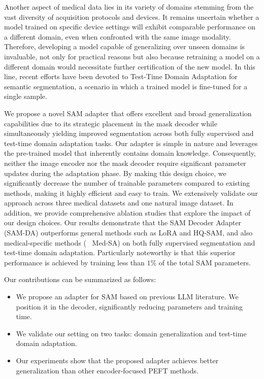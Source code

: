 Another aspect of medical data lies in its variety of domains stemming from the vast diversity of acquisition protocols and devices. It remains uncertain whether a model trained on specific device settings will exhibit comparable performance on a different domain, even when confronted with the same image modality. Therefore, developing a model capable of generalizing over unseen domains is invaluable, not only for practical reasons but also because retraining a model on a different domain would necessitate further certification of the new model. In this line, recent efforts have been devoted to Test-Time Domain Adaptation for semantic segmentation, a scenario in which a trained model is fine-tuned for a single sample. 

We propose a novel SAM adapter that offers excellent and broad generalization capabilities due to its strategic placement in the mask decoder while simultaneously yielding improved segmentation across both fully supervised and test-time domain adaptation tasks. Our adapter is simple in nature and leverages the pre-trained model that inherently contains domain knowledge. Consequently, neither the image encoder nor the mask decoder require significant parameter updates during the adaptation phase. By making this design choice, we significantly decrease the number of trainable parameters compared to existing methods, making it highly efficient and easy to train. We extensively validate our approach across three medical datasets and one natural image dataset. In addition, we provide comprehensive ablation studies that explore the impact of our design choices. Our results demonstrate that the SAM Decoder Adapter (SAM-DA) outperforms general methods such as LoRA and HQ-SAM, and also medical-specific methods (\eg~ Med-SA) on both fully supervised segmentation and test-time domain adaptation. Particularly noteworthy is that this superior performance is achieved by training less than $1\%$ of the total SAM parameters.

Our contributions can be summarized as follows:
\begin{itemize}
    \item We propose an adapter for SAM based on previous LLM literature. We position it in the decoder, significantly reducing parameters and training time.
    \item We validate our setting on two tasks: domain generalization and test-time domain adaptation. 
    \item Our experiments show that the proposed adapter achieves better generalization than other encoder-focused PEFT methods. 
\end{itemize}

